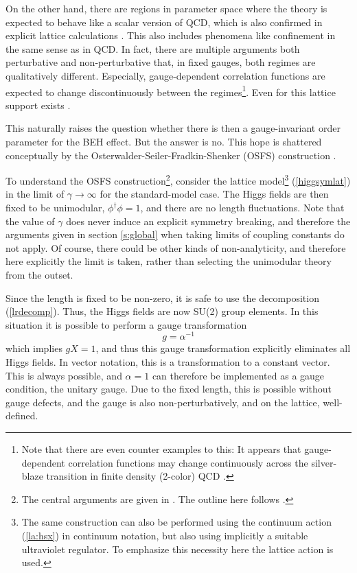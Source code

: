 \documentclass[final,twoside,12pt]{article}
\newcommand*{\no}{\noindent}
\newcommand*{\be}{\begin{equation}}
\newcommand*{\ee}{\end{equation}}
\newcommand*{\pref}[1]{(\ref{#1})}
\newcommand*{\nn}{\nonumber}
\newcommand*{\1}{1\!\!\!\bot}
\begin{document}
On the other hand, there are regions in parameter space where the theory is expected to behave like a scalar version of QCD, which is also confirmed in explicit lattice calculations \cite{Knechtli:1998gf,Knechtli:1999qe,Maas:2010nc,Maas:2013aia,Maas:2014pba}. This also includes phenomena like confinement in the same sense as in QCD. In fact, there are multiple arguments both perturbative \cite{Bohm:2001yx,Kapusta:2006pm,Damgaard:1985nb} and non-perturbative \cite{Kugo:1979gm,Schaden:2013ffa,Alkofer:2000wg,Fischler:1974ue,Nielsen:1975fs,Greensite:2017ajx,Bricmont:1985sw,Bricmont:1985by,Bricmont:1987zh} that, in fixed gauges, both regimes are qualitatively different. Especially, gauge-dependent correlation functions are expected to change discontinuously between the regimes\footnote{Note that there are even counter examples to this: It appears that gauge-dependent correlation functions may change continuously across the silver-blaze transition in finite density (2-color) QCD \cite{Boz:2018crd}.}. Even for this lattice support exists \cite{Maas:2013aia}.

This naturally raises the question whether there is then a gauge-invariant order parameter for the BEH effect. But the answer is no. This hope is shattered conceptually by the Osterwalder-Seiler-Fradkin-Shenker (OSFS) construction \cite{Osterwalder:1977pc,Fradkin:1978dv,Seiler:2015rwa,Seiler:1982pw,Glimm:1987ng}.

To understand the OSFS construction\footnote{The central arguments are given in \cite{Osterwalder:1977pc}. The outline here follows \cite{Fradkin:1978dv}.}, consider the lattice model\footnote{The same construction can also be performed using the continuum action \pref{la:hsx} in continuum notation, but also using implicitly a suitable ultraviolet regulator. To emphasize this necessity here the lattice action is used.} \pref{higgsymlat} in the limit of $\gamma\to\infty$ for the standard-model case. The Higgs fields are then fixed to be unimodular, $\phi^\dagger\phi=1$, and there are no length fluctuations. Note that the value of $\gamma$ does never induce an explicit symmetry breaking, and therefore the arguments given in section \ref{s:global} when taking limits of coupling constants do not apply. Of course, there could be other kinds of non-analyticity, and therefore here explicitly the limit is taken, rather than selecting the unimodular theory from the outset.

Since the length is fixed to be non-zero, it is safe to use the decomposition \pref{lrdecomp}. Thus, the Higgs fields are now SU(2) group elements. In this situation it is possible to perform a gauge transformation
\be
g=\alpha^{-1}\nn
\ee
\no which implies $gX=1$, and thus this gauge transformation explicitly eliminates all Higgs fields. In vector notation, this is a transformation to a constant vector. This is always possible, and $\alpha=1$ can therefore be implemented as a gauge condition, the unitary gauge. Due to the fixed length, this is possible without gauge defects, and the gauge is also non-perturbatively, and on the lattice, well-defined.
\end{document}
